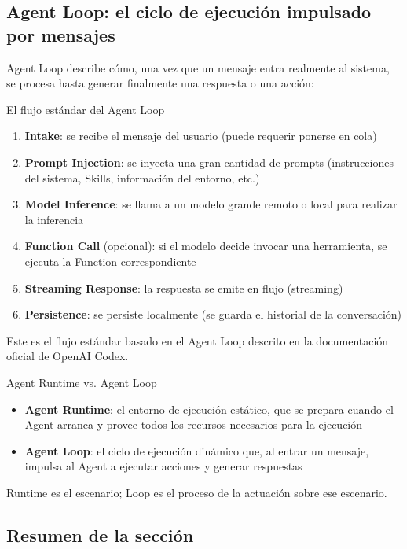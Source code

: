 \documentclass[a4paper]{article}
\begin{document}
\subsection{Agent Loop: el ciclo de ejecución impulsado por mensajes}

Agent Loop describe cómo, una vez que un mensaje entra realmente al sistema, se procesa hasta generar finalmente una respuesta o una acción:

\begin{importantbox}{El flujo estándar del Agent Loop}
\begin{enumerate}
    \item \textbf{Intake}: se recibe el mensaje del usuario (puede requerir ponerse en cola)
    \item \textbf{Prompt Injection}: se inyecta una gran cantidad de prompts (instrucciones del sistema, Skills, información del entorno, etc.)
    \item \textbf{Model Inference}: se llama a un modelo grande remoto o local para realizar la inferencia
    \item \textbf{Function Call} (opcional): si el modelo decide invocar una herramienta, se ejecuta la Function correspondiente
    \item \textbf{Streaming Response}: la respuesta se emite en flujo (streaming)
    \item \textbf{Persistence}: se persiste localmente (se guarda el historial de la conversación)
\end{enumerate}
Este es el flujo estándar basado en el Agent Loop descrito en la documentación oficial de OpenAI Codex.
\end{importantbox}

\begin{knowledgebox}{Agent Runtime vs. Agent Loop}
\begin{itemize}
    \item \textbf{Agent Runtime}: el entorno de ejecución estático, que se prepara cuando el Agent arranca y provee todos los recursos necesarios para la ejecución
    \item \textbf{Agent Loop}: el ciclo de ejecución dinámico que, al entrar un mensaje, impulsa al Agent a ejecutar acciones y generar respuestas
\end{itemize}
Runtime es el escenario; Loop es el proceso de la actuación sobre ese escenario.
\end{knowledgebox}

\subsection{Resumen de la sección}
\end{document}
